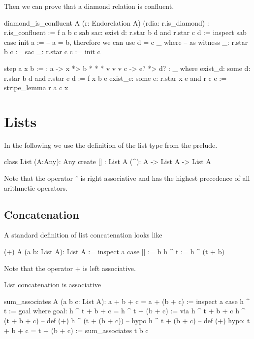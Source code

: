 Then we can prove that a diamond relation is confluent.

\begin{alba}
  diamond_is_confluent
    A
    (r: Endorelation A)
    (rdia: r.is_diamond)
    : r.is_confluent
    :=
      f a b c sab sac: exist d: r.star b d and r.star c d :=
        inspect sab case
          init a :=            -- a = b, therefore we can use d = c
            _ where            --        as witness
              _: r.star b c := sac
              _: r.star c c := init c

          step a x b :=
            {:  a  ->  x  *>  b
                *      *      *
                v      v      v
                c  ->  e? *>  d? :}
            _ where
              exist_d: some d: r.star b d and r.star e d := f x b e
              exist_e: some e: r.star x e and r c e := stripe_lemma r a c x

\end{alba}




\newpage
\section{Lists}
\label{sec:certprog-lists}


In the following we use the definition of the list type from the prelude.

\begin{alba}
  class
    List (A:Any): Any
  create
    [] : List A
    (^): A -> List A -> List A
\end{alba}
%
Note that the operator $\mathrel{\hat{\ }}$ is right associative and has the
highest precedence of all arithmetic operators.



\subsection{Concatenation}


A standard definition of list concatenation looks like

\begin{alba}
  (+) A (a b: List A): List A :=
    inspect a case
      [] :=
        b
      h ^ t :=
        h ^ (t + b)
\end{alba}
Note that the operator $+$ is left associative.


List concatenation is associative
%
\begin{alba}
  sum_associates A (a b c: List A): a + b + c = a + (b + c) :=
    inspect a case
      h ^ t :=
        goal where
          goal: h ^ t + b + c = h ^ t + (b + c) :=
            via
               h ^ t + b + c
               h ^ (t + b + c)      -- def (+)
               h ^ (t + (b + c))    -- hypo
               h ^ t + (b + c)      -- def (+)
          hypo: t + b + c = t + (b + c) :=
            sum_associates t b c
\end{alba}


